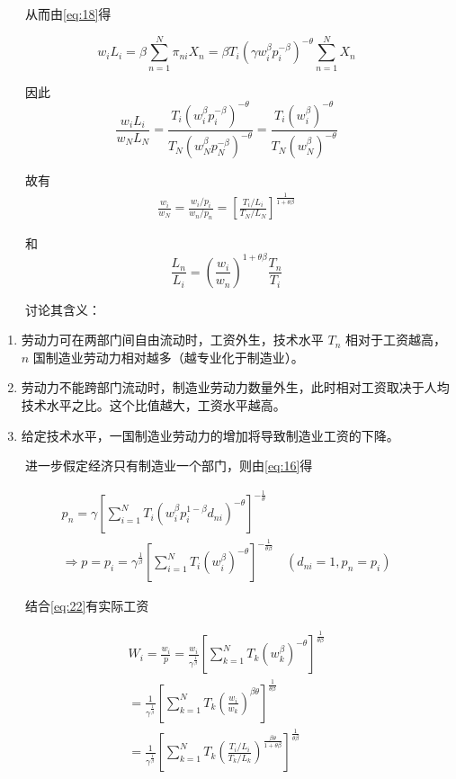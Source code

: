 \documentclass[]{article}
\providecommand{\tightlist}{%
  \setlength{\itemsep}{0pt}\setlength{\parskip}{0pt}}
\begin{document}
　　从而由\eqref{eq:18}得

\[
w_{i} L_{i}=\beta \sum_{n=1}^{N} \pi_{n i} X_{n}=\beta T_{i}\left(\gamma w_{i}^{\beta} p_{i}^{-\beta}\right)^{-\theta} \sum_{n=1}^{N} X_{n}
\]

　　因此
\[\frac{w_{i} L_{i}}{w_{N} L_{N}}=\frac{T_{i}\left(w_{i}^{\beta} p_{i}^{-\beta}\right)^{-\theta}}{T_{N}\left(w_{N}^{\beta} p_{N}^{-\beta}\right)^{-\theta}}=\frac{T_{i}\left(w_{i}^{\beta}\right)^{-\theta}}{T_{N}\left(w_{N}^{\beta}\right)^{-\theta}}\]

　　故有
\begin{align}
\frac{w_{i}}{w_{N}}=\frac{w_i/p_i}{w_n/p_n}=\left[\frac{T_{i} / L_{i}}{T_{N} / L_{N}}\right]^{\frac{1}{1+\theta \beta}} \label{eq:22}
\end{align}

　　和
\[\frac{L_n}{L_i}=\left(\frac{w_i}{w_n}\right)^{1+\theta\beta}\frac{T_n}{T_i}\]

　　讨论其含义：

\begin{enumerate}
\def\labelenumi{\arabic{enumi}.}
\tightlist
\item
  劳动力可在两部门间自由流动时，工资外生，技术水平 \(T_n\) 相对于工资越高，\(n\) 国制造业劳动力相对越多（越专业化于制造业）。\\
\item
  劳动力不能跨部门流动时，制造业劳动力数量外生，此时相对工资取决于人均技术水平之比。这个比值越大，工资水平越高。
\item
  给定技术水平，一国制造业劳动力的增加将导致制造业工资的下降。
\end{enumerate}

　　进一步假定经济只有制造业一个部门，则由\eqref{eq:16}得

\[
\begin{array}{l}{p_{n}=\gamma\left[\sum_{i=1}^{N} T_{i}\left(w_{i}^{\beta} p_{i}^{1-\beta} d_{n i}\right)^{-\theta}\right]^{-\frac{1}{\theta}}} \\ {\Rightarrow p=p_{i}=\gamma^{\frac{1}{\beta}}\left[\sum_{i=1}^{N} T_{i}\left(w_{i}^{\beta}\right)^{-\theta}\right]^{-\frac{1}{\theta \beta}} \quad\left(d_{n i}=1, p_{n}=p_{i}\right)}\end{array}
\]

　　结合\eqref{eq:22}有实际工资

\[
\begin{array}{l}{W_{i}=\frac{w_{i}}{p}=\frac{w_{i}}{\gamma^{\frac{1}{\beta}}}\left[\sum_{k=1}^{N} T_{k}\left(w_{k}^{\beta}\right)^{-\theta}\right]^{\frac{1}{\theta \beta}}} \\ {=\frac{1}{\gamma^{\frac{1}{\beta}}}\left[\sum_{k=1}^{N} T_{k}\left(\frac{w_{i}}{w_{k}}\right)^{\beta \theta}\right]^{\frac{1}{\theta \beta}}} \\ {=\frac{1}{\gamma^{\frac{1}{\beta}}}\left[\sum_{k=1}^{N} T_{k}\left(\frac{T_{i} / L_{i}}{T_{k} / L_{k}}\right)^{\frac{\beta \theta}{1+\theta \beta}}\right]^{\frac{1}{\theta \beta}}}\end{array}
\]
\end{document}
